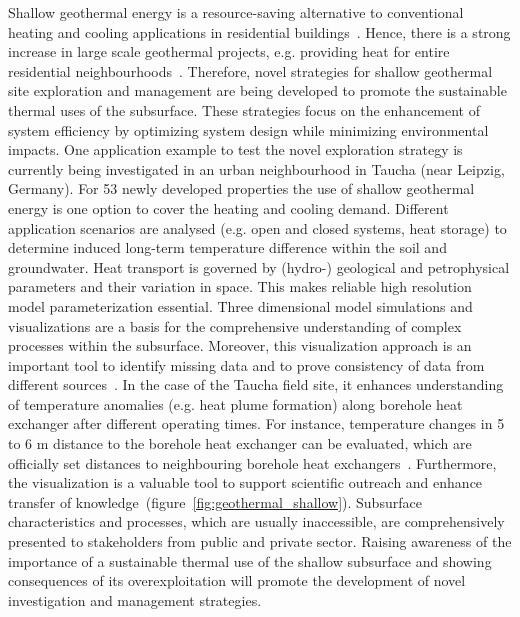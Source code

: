 \documentclass[twocolumn]{svjour3}          %
\begin{document}
Shallow geothermal energy is a resource-saving alternative to conventional heating and cooling applications in residential buildings~\cite{haehnlein:2013}. Hence, there is a strong increase in large scale geothermal projects, e.g. providing heat for entire residential neighbourhoods~\cite{alkan:2013}. Therefore, novel strategies for shallow geothermal site exploration and management are being developed to promote the sustainable thermal uses of the subsurface. These strategies focus on the enhancement of system efficiency by optimizing system design while minimizing environmental impacts. One application example to test the novel exploration strategy is currently being investigated in an urban neighbourhood in Taucha (near Leipzig, Germany). For 53 newly developed properties the use of shallow geothermal energy is one option to cover the heating and cooling demand. Different application scenarios are analysed (e.g. open and closed systems, heat storage) to determine induced long-term temperature difference within the soil and groundwater. Heat transport is governed by (hydro-) geological and petrophysical parameters and their variation in space. This makes reliable high resolution model parameterization essential. Three dimensional model simulations and visualizations are a basis for the comprehensive understanding of complex processes within the subsurface. Moreover, this visualization approach is an important tool to identify missing data and to prove consistency of data from different sources~\cite{vienken:2014}. In the case of the Taucha field site, it enhances understanding of temperature anomalies (e.g. heat plume formation) along borehole heat exchanger after different operating times. For instance, temperature changes in 5 to 6 m distance to the borehole heat exchanger can be evaluated, which are officially set distances to neighbouring borehole heat exchangers~\cite{haehnlein:2011}. Furthermore, the visualization is a valuable tool to support scientific outreach and enhance transfer of knowledge~(figure~\ref{fig:geothermal_shallow}). Subsurface characteristics and processes, which are usually inaccessible, are comprehensively presented to stakeholders from public and private sector. Raising awareness of the importance of a sustainable thermal use of the shallow subsurface and showing consequences of its overexploitation will promote the development of novel investigation and management strategies.
\end{document}

